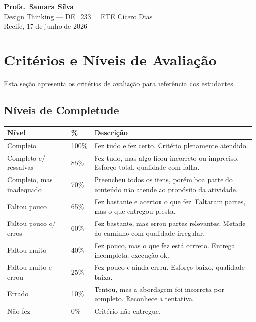 \documentclass[
  sigconf,
  nonacm, %
  language=portuguese
]{acmart}
\begin{document}
\begin{flushright}
\textbf{Profa.\ Samara Silva}\\
{\small\color{cmuted} Design Thinking --- DE\_233 · ETE Cícero Dias}\\
{\small\color{cmuted} Recife, 17 de junho de 2026}
\end{flushright}


\appendix
\onecolumn
\section{Critérios e Níveis de Avaliação}

Esta seção apresenta os critérios de avaliação para referência dos estudantes.

\subsection{Níveis de Completude}

\begin{tabularx}{\linewidth}{@{} p{4cm} p{1.5cm} X @{}}
\toprule
\textbf{Nível} & \textbf{\%} & \textbf{Descrição} \\
\midrule
Completo & 100\% & Fez tudo e fez certo. Critério plenamente atendido. \\
Completo c/ ressalvas & 85\% & Fez tudo, mas algo ficou incorreto ou impreciso. Esforço total, qualidade com falha. \\
Completo, mas inadequado & 70\% & Preencheu todos os itens, porém boa parte do conteúdo não atende ao propósito da atividade. \\
Faltou pouco & 65\% & Fez bastante e acertou o que fez. Faltaram partes, mas o que entregou presta. \\
Faltou pouco c/ erros & 60\% & Fez bastante, mas errou partes relevantes. Metade do caminho com qualidade irregular. \\
Faltou muito & 40\% & Fez pouco, mas o que fez está correto. Entrega incompleta, execução ok. \\
Faltou muito e errou & 25\% & Fez pouco e ainda errou. Esforço baixo, qualidade baixa. \\
Errado & 10\% & Tentou, mas a abordagem foi incorreta por completo. Reconhece a tentativa. \\
Não fez & 0\% & Critério não entregue. \\
\bottomrule
\end{tabularx}
\end{document}
